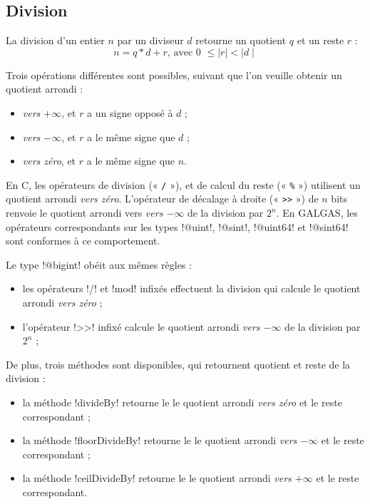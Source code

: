 \subsection{Division}



La division d'un entier $n$ par un diviseur $d$ retourne un quotient $q$ et un reste $r$ :
\begin{equation*}
n = q * d + r\text{, avec 0 } \leqslant \mid r\mid < \mid d\mid
\end{equation*}

Trois opérations différentes sont possibles, suivant que l'on veuille obtenir un quotient arrondi :
\begin{itemize}
\item \emph{vers $+\infty$}, et $r$ a un signe opposé à $d$ ;
\item \emph{vers $-\infty$}, et $r$ a le même signe que $d$ ;
\item \emph{vers zéro}, et $r$ a le même signe que $n$.
\end{itemize}

En C, les opérateurs de division (« \texttt{/} »), et de calcul du reste (« \texttt{\%} ») utilisent un quotient arrondi \emph{vers zéro}. L'opérateur de décalage à droite (« \texttt{>{}>} ») de $n$ bits renvoie le quotient arrondi vers \emph{vers $-\infty$} de la division par $2^n$. En GALGAS, les opérateurs correspondants sur les types \ggs!@uint!, \ggs!@sint!, \ggs!@uint64! et \ggs!@sint64! sont conformes à ce comportement.

Le type \ggs!@bigint! obéit aux mêmes règles :
\begin{itemize}
\item les opérateurs \ggs!/! et \ggs!mod! infixés effectuent la division qui calcule le quotient arrondi \emph{vers zéro} ;
  \item l'opérateur \ggs!>>! infixé calcule le quotient arrondi \emph{vers $-\infty$} de la division par $2^n$ ;
\end{itemize}

De plus, trois méthodes sont disponibles, qui retournent quotient et reste de la division :
\begin{itemize}
  \item la méthode \ggs!divideBy! retourne le le quotient arrondi \emph{vers zéro} et le reste correspondant ;
  \item la méthode \ggs!floorDivideBy! retourne le le quotient arrondi \emph{vers $-\infty$} et le reste correspondant ;
  \item la méthode \ggs!ceilDivideBy! retourne le le quotient arrondi \emph{vers $+\infty$} et le reste correspondant.
\end{itemize}


